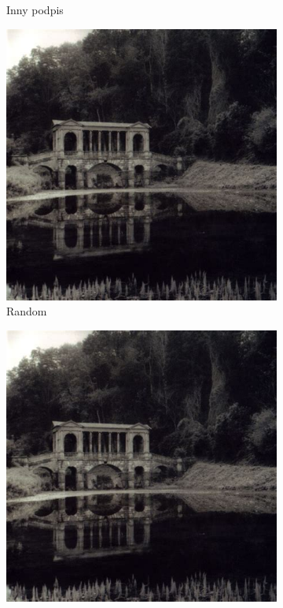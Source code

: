 \documentclass[12pt]{article}
\begin{document}
\begin{figure}[h!]
\begin{subfigure}[b]{0.32\linewidth}
		\caption{Inny podpis}
	\end{subfigure}
	\begin{subfigure}[b]{0.32\linewidth}
		\includegraphics[width=\linewidth]{zdj/morn.jpeg}
		\caption{Random}
	\end{subfigure}
	\begin{subfigure}[b]{0.48\linewidth}
		\includegraphics[width=\linewidth]{zdj/morn.jpeg}

\end{subfigure}
\end{figure}
\end{document}
